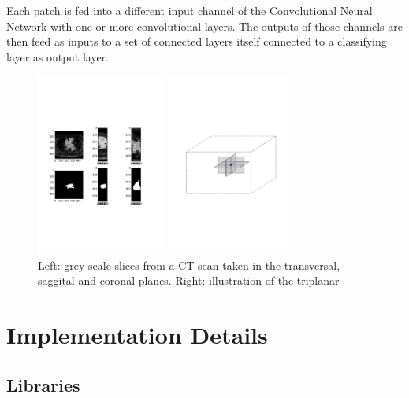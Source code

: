 \noindent Each patch is fed into a different input channel of the Convolutional Neural Network with one or more convolutional layers. The outputs of those channels are then feed as inputs to a set of connected layers itself connected to a classifying layer as output layer.

\begin{figure}
\centering
\begin{minipage}{0.45\textwidth}
\centering
\includegraphics[trim=2cm 8cm 2cm 8cm, clip=true, height=60mm]{Chapter3/example_slice.pdf}
\end{minipage}\hfill
\begin{minipage}{0.45\textwidth}
\centering
\includegraphics[trim=2cm 8cm 2cm 8cm, clip=true, height=60mm]{Chapter3/triplanar.pdf}
\end{minipage}
\caption{Left: grey scale slices from a CT scan taken in the transversal, saggital and coronal planes. Right: illustration of the triplanar}
\end{figure}

\section{Implementation Details}

\subsection{Libraries}

